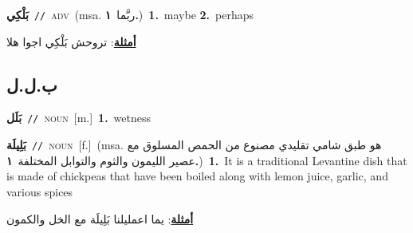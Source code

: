 \documentclass[10pt,a4paper,twoside]{article} %
\begin{document}
\begin{multicols}{2}
{\setlength\topsep{0pt}\textbf{\foreignlanguage{arabic}{بَلْكِي}}\ {\color{gray}\texttt{//}\color{black}}\ \textsc{adv}\ \color{gray}(msa. \foreignlanguage{arabic}{ربَّما}~\foreignlanguage{arabic}{\textbf{١.}})\color{black}\ \textbf{1.}~maybe  \textbf{2.}~perhaps\  \begin{flushright}\color{gray}\foreignlanguage{arabic}{\textbf{\underline{\foreignlanguage{arabic}{أمثلة}}}: تروحش بَلْكِي اجوا هلا}\end{flushright}\color{black}} \vspace{2mm}

\vspace{-3mm}
\subsection*{\color{blue}\foreignlanguage{arabic}{ب.ل.ل}\color{blue}{}} 

{\setlength\topsep{0pt}\textbf{\foreignlanguage{arabic}{بَلَل}}\ {\color{gray}\texttt{//}\color{black}}\ \textsc{noun}\ [m.]\ \textbf{1.}~wetness\ } \vspace{2mm}

{\setlength\topsep{0pt}\textbf{\foreignlanguage{arabic}{بَلِيلَة}}\ {\color{gray}\texttt{//}\color{black}}\ \textsc{noun}\ [f.]\ \color{gray}(msa. \foreignlanguage{arabic}{هو طبق شامي تقليدي مصنوع من الحمص المسلوق مع عصير الليمون والثوم والتوابل المختلفة}~\foreignlanguage{arabic}{\textbf{١.}})\color{black}\ \textbf{1.}~It is a traditional Levantine dish that is made of chickpeas that have been boiled along with lemon juice, garlic, and various spices\  \begin{flushright}\color{gray}\foreignlanguage{arabic}{\textbf{\underline{\foreignlanguage{arabic}{أمثلة}}}: يما اعمليلنا بَلِيلَة مع الخل والكمون}\end{flushright}\color{black}} \vspace{2mm}


\end{multicols}
\end{document}
